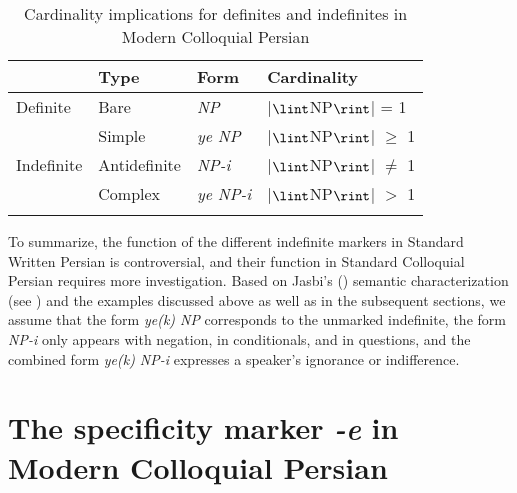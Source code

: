 \documentclass[output=paper]{langsci/langscibook}
\begin{document}
\begin{table}

\begin{tabularx}{\textwidth}{XXXl}
\lsptoprule
 		& Type 	& Form 	& Cardinality \\
\midrule
Definite 	& Bare 	& {\emph{NP}} 	& |$\lint$NP$\rint$| = 1 \\[1mm]
\hdashline
		& Simple		& {\emph{ye NP}}	& |$\lint$NP$\rint$| $\geq$ 1 \\
Indefinite	& Antidefinite 	& {\emph{NP-i}}		& |$\lint$NP$\rint$| $\not=$ 1 \\
		& Complex		& {\emph{ye NP-i}}	& |$\lint$NP$\rint$| $>$ 1 \\
\lspbottomrule
\end{tabularx}
\caption{Cardinality implications for definites and indefinites in Modern Colloquial Persian \citep[][251]{jasbi:16}}\label{4table:4}
\end{table}

{
To summarize, the function of the different indefinite markers in Standard Written Persian is controversial, and their function in Standard Colloquial Persian requires more investigation. Based on Jasbi's (\citeyear{jasbi:16}) semantic characterization (see ) and the examples discussed above as well as in the subsequent sections, we assume that the form {\emph{ye(k) NP}} corresponds to the unmarked indefinite, the form {\emph{NP-i}} only appears with negation, in conditionals, and in questions, and the combined form {\emph{ye(k) NP-i}} expresses a speaker's ignorance or indifference.
}


\section{The specificity marker {\emph{-e}} in Modern Colloquial Persian}\label{4sec:4}
\end{document}
